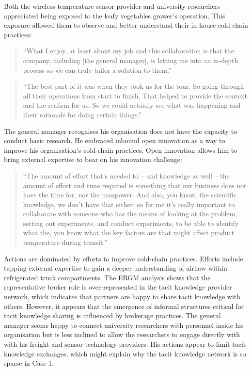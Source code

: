 Both the wireless temperature sensor provider and university researchers appreciated being exposed to the leafy vegetables grower's operation. This exposure allowed them to observe and better understand their in-house cold-chain practices:

\begin{quote}
\small
\enquote{What I enjoy, at least about my job and this collaboration is that the company, including [the general manager], is letting me into an in-depth process so we can truly tailor a solution to them.} \\
\end{quote}

\begin{quote}
\small
\enquote{The best part of it was when they took us for the tour. So going through all their operations from start to finish. That helped to provide the context and the realism for us. So we could actually see what was happening and their rationale for doing certain things.} \\
\end{quote}

The general manager recognises his organisation does not have the capacity to conduct basic research. He embraced inbound open innovation as a way to improve his organisation's cold-chain practices. Open innovation allows him to bring external expertise to bear on his innovation challenge:

\begin{quote}
\small
\enquote{The amount of effort that's needed to – and knowledge as well – the amount of effort and time required is something that our business does not have the time for, nor the manpower. And also, you know, the scientific knowledge, we don't have that either, so for me it's really important to collaborate with someone who has the means of looking at the problem, setting out experiments, and conduct experiments, to be able to identify what the, you know what the key factors are that might affect product temperature during transit.} \\
\end{quote}

Actions are dominated by efforts to improve cold-chain practices. Efforts include tapping external expertise to gain a deeper understanding of airflow within refrigerated truck compartments. The ERGM analysis shows that the representative broker role is over-represented in the tacit knowledge provider network, which indicates that partners are happy to share tacit knowledge with others. However, it appears that the emergence of informal structures critical for tacit knowledge sharing is influenced by brokerage practices. The general manager seems happy to connect university researchers with personnel inside his organisation but is less inclined to allow the researchers to engage directly with with his freight and sensor technology providers. His actions appear to limit tacit knowledge exchanges, which might explain why the tacit knowledge network is so sparse in Case 1.


